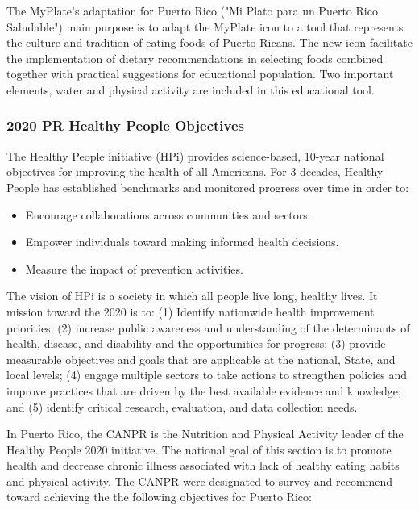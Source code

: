\documentclass[12pt,letterpaper]{report}
\begin{document}
The MyPlate's adaptation for Puerto Rico ("Mi Plato para un Puerto Rico Saludable") main purpose is to adapt the MyPlate icon to a tool that represents the culture and tradition of eating foods of Puerto Ricans. The new icon facilitate the implementation of dietary recommendations in selecting foods combined together with practical suggestions for educational population. Two important elements, water and physical activity are included in this educational tool. \cite{MiPlatoPR}

\subsubsection{2020 PR Healthy People Objectives}

The Healthy People initiative (HPi) provides science-based, 10-year national objectives for improving the health of all Americans. For 3 decades, Healthy People has established benchmarks and monitored progress over time in order to:
   \begin{itemize}
        \item Encourage collaborations across communities and sectors.
        \item Empower individuals toward making informed health decisions.
        \item Measure the impact of prevention activities.
	\end{itemize}

The vision of HPi is a society in which all people live long, healthy lives. It mission toward the 2020 is to: (1) Identify nationwide health improvement priorities; (2) increase public awareness and understanding of the determinants of health, disease, and disability and the opportunities for progress; (3) provide measurable objectives and goals that are applicable at the national, State, and local levels; (4) engage multiple sectors to take actions to strengthen policies and improve practices that are driven by the best available evidence and knowledge; and (5) identify critical research, evaluation, and data collection needs.

In Puerto Rico, the CANPR is the Nutrition and Physical Activity leader of the Healthy People 2020 initiative. The national goal of this section is to promote health and decrease chronic illness associated with lack of healthy eating habits and physical activity.  The CANPR were designated to survey and recommend toward achieving the the following objectives for Puerto Rico:
 
\end{document}
